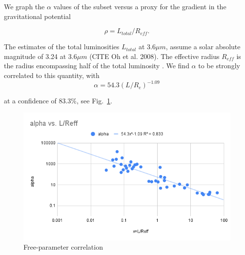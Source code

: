 \documentclass[reprint,%
 amsmath,amssymb,
 aps,
]{revtex4-1}
\begin{document}


  We graph the  $\alpha$ values of the subset versus a proxy for the gradient in the gravitational potential
  
   \begin{equation}
     \rho = L_{total}/R_{eff}.
 \end{equation}
 
 The  estimates of the  total luminosities $L_{total}$ at $3.6 \mu m$,  assume a solar
absolute magnitude of 3.24 at $3.6 \mu m$ (CITE Oh et al. 2008). The effective radius $R_{eff}$ is    the radius encompassing half of the total luminosity \citet{2016Lelli}.  We find $\alpha$  to be   strongly correlated to  this quantity, with 
\begin{equation}
    \alpha = 54.3 (L/R_e)^{-1.09}
\end{equation}

at a confidence of $83.3\%$, see Fig.~\ref{alpha2}.
  
 \begin{figure}[h]
\includegraphics[width=\linewidth]{alphavL_Reff.png} 
\caption{  Free-parameter correlation   }
\label{alpha2}
\end{figure}  
 
\end{document}
